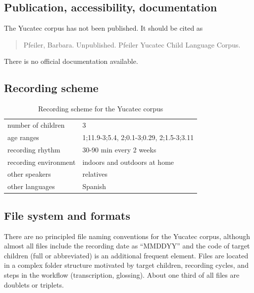 \documentclass[a4paper, 11pt]{book}
\begin{document}
\subsection{Publication, accessibility, documentation}

The Yucatec corpus \citep{Pfeiler2015a} has not been published. It should be cited as 

\begin{quote}
	Pfeiler, Barbara. Unpublished. Pfeiler Yucatec Child Language Corpus.
\end{quote}

\noindent There is no official documentation available. 


\subsection{Recording scheme}

\begin{table}[ht]
	\centering
	\begin{tabular}{ll}
		\toprule
		number of children 	& 3 \\
		age ranges 			& 1;11.9-3;5.4, 2;0.1-3;0.29, 2;1.5-3;3.11 \\
		recording rhythm 	& 30-90 min every 2 weeks \\
		recording environment & indoors and outdoors at home \\
		other speakers 		& relatives \\
		other languages		& Spanish \\
		\bottomrule
	\end{tabular}
	\caption{Recording scheme for the Yucatec corpus}
	\label{tab:Yucatec recording scheme}
\end{table}


\subsection{File system and formats}
\label{subsec: Yucatec file system and formats}

There are no principled file naming conventions for the Yucatec corpus, although almost all files include the recording date as “MMDDYY” and the code of target children (full or abbreviated) is an additional frequent element. Files are located in a complex folder structure motivated by target children, recording cycles, and steps in the workflow (transcription, glossing). About one third of all files are doublets or triplets.
\end{document}
